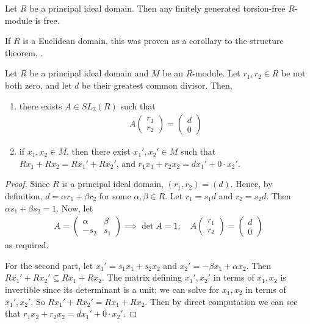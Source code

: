 \begin{theorem} \label{thm:17.1}
	Let $R$ be a principal ideal domain.
	Then any finitely generated torsion-free $R$-module is free.
\end{theorem}

If $R$ is a Euclidean domain, this was proven as a corollary to the structure theorem, .

\begin{lemma} \label{lem:17.2}
	Let $R$ be a principal ideal domain and $M$ be an $R$-module.
	Let $r_1, r_2 \in R$ be not both zero, and let $d$ be their greatest common divisor.
	Then,
	\begin{enumerate}
		\item there exists $A \in SL_2(R)$ such that
		      \begin{align*}
			      A \begin{pmatrix}
				      r_1 \\
				      r_2
			      \end{pmatrix} = \begin{pmatrix}
				      d \\
				      0
			      \end{pmatrix}
		      \end{align*}
		\item if $x_1, x_2 \in M$, then there exist $x_1', x_2' \in M$ such that $Rx_1 + Rx_2 = Rx_1' + Rx_2'$, and $r_1 x_1 + r_2 x_2  = d x_1' + 0 \cdot x_2'$.
	\end{enumerate}
\end{lemma}
\begin{proof}
	Since $R$ is a principal ideal domain, $(r_1, r_2) = (d)$.
	Hence, by definition, $d = \alpha r_1 + \beta r_2$ for some $\alpha, \beta \in R$.
	Let $r_1 = s_1 d$ and $r_2 = s_2 d$.
	Then $\alpha s_1 + \beta s_2 = 1$.
	Now, let
	\begin{align*}
		A = \begin{pmatrix}
			\alpha & \beta \\
			-s_2   & s_1
		\end{pmatrix} \implies \det A = 1;\quad A \begin{pmatrix}
			r_1 \\
			r_2
		\end{pmatrix} = \begin{pmatrix}
			d \\
			0
		\end{pmatrix}
	\end{align*}
	as required.

	For the second part, let $x_1' = s_1 x_1 + s_2 x_2$ and $x_2' = -\beta x_1 + \alpha x_2$.
	Then $Rx_1' + Rx_2' \subseteq Rx_1 + Rx_2$.
	The matrix defining $x_1', x_2'$ in terms of $x_1, x_2$ is invertible since its determinant is a unit; we can solve for $x_1, x_2$ in terms of $x_1', x_2'$.
	So $Rx_1' + Rx_2' = Rx_1 + Rx_2$.
	Then by direct computation we can see that $r_1 x_2 + r_2 x_2 = d x_1' + 0 \cdot x_2'$.
\end{proof}

